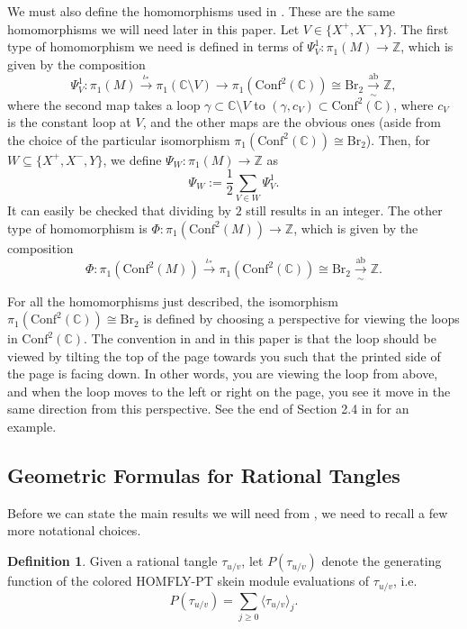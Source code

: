 \documentclass[11pt]{amsart}
\theoremstyle{plain}
\theoremstyle{definition}
\newtheorem{definitionN}[theoremN]{Definition}
\theoremstyle{remark}
\begin{document}
We must also define the homomorphisms used in \cite{JHpI26}. These are the same homomorphisms we will need later in this paper. Let $V\in\{X^+,X^-,Y\}$. The first type of homomorphism we need is defined in terms of $\Psi_V^1:\pi_1(M)\to\mathbb{Z}$, which is given by the composition
\[
\Psi_V^1:\pi_1(M)\xrightarrow{\iota_*} \pi_1(\mathbb{C}\setminus V)\to \pi_1(\text{Conf}^2(\mathbb{C}))\cong \text{Br}_2\xrightarrow[\sim]{\text{ab}} \mathbb{Z},
\]
where the second map takes a loop $\gamma\subset \mathbb{C}\setminus V$ to $(\gamma, c_V)\subset \text{Conf}^2(\mathbb{C})$, where $c_V$ is the constant loop at $V$, and the other maps are the obvious ones (aside from the choice of the particular isomorphism $\pi_1(\text{Conf}^2(\mathbb{C}))\cong \text{Br}_2$). Then, for $W\subseteq \{X^+,X^-,Y\}$, we define $\Psi_W:\pi_1(M)\to\mathbb{Z}$ as
\[
\Psi_W:=\frac{1}{2}\sum_{V\in W}\Psi_V^1.
\]
It can easily be checked that dividing by $2$ still results in an integer. The other type of homomorphism is $\Phi:\pi_1(\text{Conf}^2(M))\to \mathbb{Z}$, which is given by the composition
\[
\Phi:\pi_1(\text{Conf}^2(M))\xrightarrow{\iota_*}\pi_1(\text{Conf}^2(\mathbb{C}))\cong \text{Br}_2\xrightarrow[\sim]{\text{ab}} \mathbb{Z}.
\]

For all the homomorphisms just described, the isomorphism $\pi_1(\text{Conf}^2(\mathbb{C}))\cong \text{Br}_2$ is defined by choosing a perspective for viewing the loops in $\text{Conf}^2(\mathbb{C})$. The convention in \cite{JHpI26} and in this paper is that the loop should be viewed by tilting the top of the page towards you such that the printed side of the page is facing down. In other words, you are viewing the loop from above, and when the loop moves to the left or right on the page, you see it move in the same direction from this perspective. See the end of Section 2.4 in \cite{JHpI26} for an example.

\subsection{Geometric Formulas for Rational Tangles}

Before we can state the main results we will need from \cite{JHpI26}, we need to recall a few more notational choices.

\begin{definitionN}
    Given a rational tangle $\tau_{u/v}$, let $P(\tau_{u/v})$ denote the generating function of the colored HOMFLY-PT skein module evaluations of $\tau_{u/v}$, i.e.
    \[
    P(\tau_{u/v})=\sum_{j\geq 0}\langle\tau_{u/v}\rangle_j.
    \]
\end{definitionN}
\end{document}
